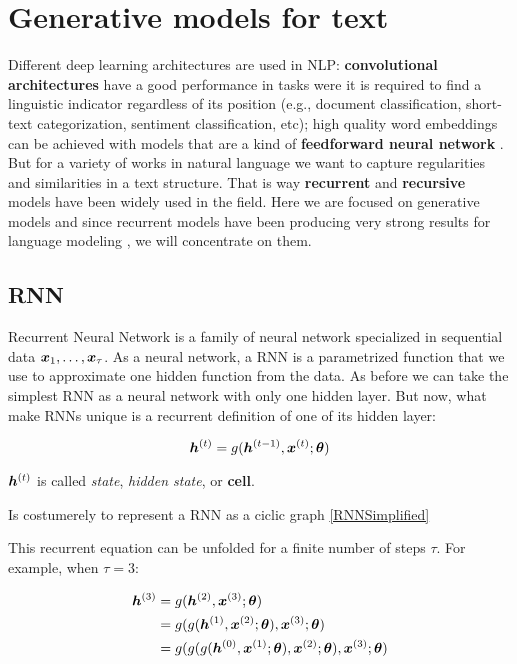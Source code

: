 \chapter{Generative models for text}\label{gen}

Different deep learning architectures are used in NLP: \textbf{convolutional architectures} have a good performance in tasks were it is required to find a linguistic indicator regardless of its position (e.g., document classification, short-text categorization, sentiment classification, etc); high quality word embeddings can be achieved with models that are a kind of \textbf{feedforward neural network} \cite{Mikolov23}. But for a variety of works in natural language we want to capture regularities and similarities in a text structure. That is way \textbf{recurrent} and \textbf{recursive} models have been widely used in the field. Here we are focused on generative models and since recurrent models have been producing very strong results for language modeling \cite{goldberg15}, we will concentrate on them.

\section{RNN}

Recurrent Neural Network is a family of neural network specialized in sequential data $\bm{x}_1, \dots, \bm{x}_\tau$. As a neural network, a RNN is a parametrized function that we use to approximate one hidden function from the data. As before we can take the simplest RNN as a neural network with only one hidden layer. But now, what make RNNs unique is a recurrent definition of one of its hidden layer:

\begin{equation}
\bm{h}^{(t)} = g(\bm{h}^{(t-1)}, \bm{x}^{(t)}; \bm{\theta})
\end{equation}

$\bm{h}^{(t)}$ is called \textit{state}, \textit{hidden state}, or \textbf{cell}.

Is costumerely to represent a RNN as a ciclic graph \ref{RNNSimplified}



\par This recurrent equation can be unfolded for a finite number of steps $\tau$. For example, when $\tau =3$:
\vspace{0.2cm}

\begin{align}
\bm{h}^{(3)}& = g(\bm{h}^{(2)}, \bm{x}^{(3)}; \bm{\theta})\\
 & = g(g(\bm{h}^{(1)}, \bm{x}^{(2)}; \bm{\theta}), \bm{x}^{(3)}; \bm{\theta})\\
 & = g(g(g(\bm{h}^{(0)}, \bm{x}^{(1)}; \bm{\theta}), \bm{x}^{(2)}; \bm{\theta}), \bm{x}^{(3)}; \bm{\theta})\\
\end{align}



